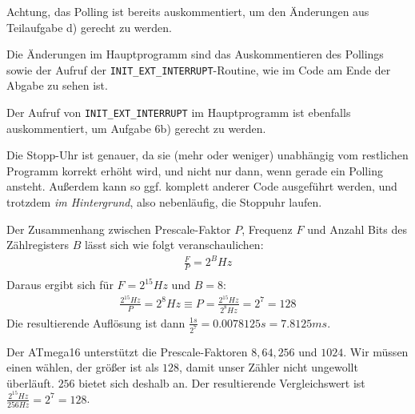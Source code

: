 \documentclass{CInf_practice}
\begin{document}




Achtung, das Polling ist bereits auskommentiert, um den Änderungen aus 
Teilaufgabe d) gerecht zu werden.







Die Änderungen im Hauptprogramm sind das Auskommentieren des Pollings sowie
der Aufruf der \texttt{INIT\_EXT\_INTERRUPT}-Routine, wie im Code am Ende der 
Abgabe zu sehen ist.

Der Aufruf von \texttt{INIT\_EXT\_INTERRUPT} im Hauptprogramm ist ebenfalls 
auskommentiert, um Aufgabe 6b) gerecht zu werden.



Die Stopp-Uhr ist genauer, da sie (mehr oder weniger) unabhängig vom 
restlichen Programm korrekt erhöht wird, und nicht nur dann, wenn gerade ein 
Polling ansteht. Außerdem kann so ggf. komplett anderer Code ausgeführt werden,
und trotzdem \emph{im Hintergrund}, also nebenläufig, die Stoppuhr laufen.

Der Zusammenhang zwischen Prescale-Faktor $P$, Frequenz $F$ und Anzahl Bits 
des Zählregisters $B$ lässt sich wie folgt veranschaulichen:
\begin{align*}
\frac{F}{P} = 2^B Hz\\
\end{align*}
Daraus ergibt sich für $F = 2^{15} Hz$ und $B = 8$:
\begin{align*}
\frac{2^{15} Hz}{P} = 2^8 Hz \equiv P = \frac{2^{15} Hz}{2^8 Hz} = 2^7 = 128
\end{align*}
Die resultierende Auflösung ist dann $\frac{1 s}{2^7} = 0.0078125 s = 7.8125 ms$.

Der ATmega16 unterstützt die Prescale-Faktoren $8, 64, 256$ und $1024$. Wir 
müssen einen wählen, der größer ist als $128$, damit unser Zähler nicht 
ungewollt überläuft. $256$ bietet sich deshalb an. Der resultierende 
Vergleichswert ist $\frac{2^{15} Hz}{256 Hz} = 2^7 = 128$.
\end{document}
